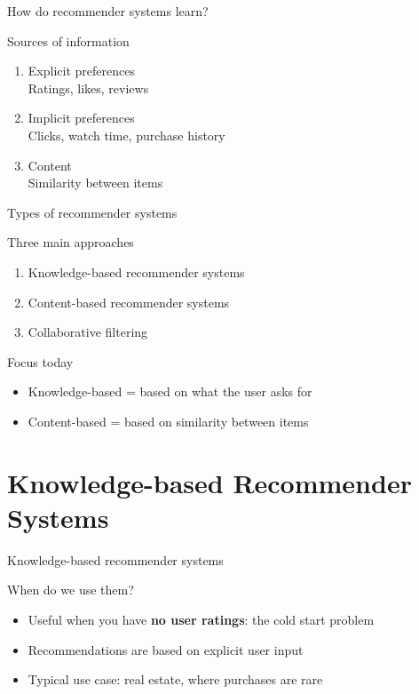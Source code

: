 \documentclass[compress]{beamer}
\begin{document}
\begin{frame}{How do recommender systems learn?}
  \begin{block}{Sources of information}
    \begin{enumerate}[<+>]
      \item \alert{Explicit preferences} \\
      Ratings, likes, reviews

      \item \alert{Implicit preferences} \\
      Clicks, watch time, purchase history

      \item \alert{Content} \\
      Similarity between items
    \end{enumerate}
  \end{block}
\end{frame}

\begin{frame}{Types of recommender systems}
  \begin{block}{Three main approaches \parencite{Wieland2021, Locherbach2018, Moller2018}}
    \begin{enumerate}[<+>]
      \item Knowledge-based recommender systems
      \item Content-based recommender systems
      \item Collaborative filtering
    \end{enumerate}
  \end{block}
  \pause
  \begin{alertblock}{Focus today}
    \begin{itemize}
      \item Knowledge-based = based on what the user asks for
      \item Content-based = based on similarity between items
    \end{itemize}
  \end{alertblock}
\end{frame}

\section[Knowledge-based RS]{Knowledge-based Recommender Systems}

\begin{frame}{Knowledge-based recommender systems}
  \begin{block}{When do we use them?}
    \begin{itemize}[<+>]
      \item Useful when you have \textbf{no user ratings}: the cold start problem
      \item Recommendations are based on explicit user input
      \item Typical use case: real estate, where purchases are rare
    \end{itemize}
  \end{block}
\end{frame}
\end{document}

